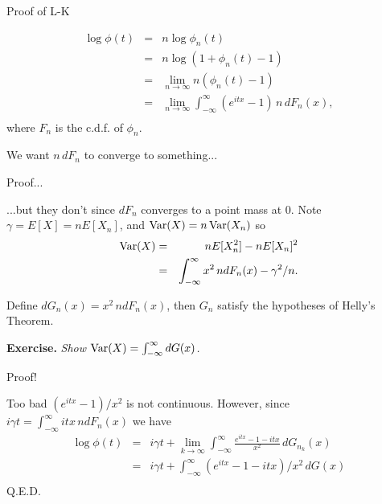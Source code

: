 \documentclass{amsart}
\newcommand{\Var}{\mathop{\rm Var}}
\begin{document}
\begin{section}{Proof of L-K}

\begin{eqnarray*}
\log\phi(t) &=& n\log\phi_n(t)\\
	&=& n\log (1 + \phi_n(t) - 1)\\
	&=& \lim_{n\to\infty} n(\phi_n(t) - 1)\\
	&=&  \lim_{n\to\infty}\int_{-\infty}^\infty (e^{itx} - 1)\,n\,dF_n(x),\\
\end{eqnarray*}
where $F_n$ is the c.d.f. of $\phi_n$.

\smallskip

We want $n\,dF_n$ to converge to something...

\end{section}

\begin{section}{Proof...}

...but they don't since $dF_n$ converges to a point mass at 0.
Note $\gamma = E[X] = nE[X_n]$, and $\Var(X) = n\Var(X_n)$ so
\begin{eqnarray*}
\Var(X) &=& nE[X_n^2] - nE[X_n]^2\\
	&=& \int_{-\infty}^\infty x^2\,ndF_n(x) - \gamma^2/n.\\
\end{eqnarray*}

Define $dG_n(x) = x^2\,ndF_n(x)$, then $G_n$ satisfy the hypotheses
of Helly's Theorem.

\smallskip

{\bf Exercise.} {\it Show $\Var(X) = \int_{-\infty}^\infty dG(x)$.}

\end{section}

\begin{section}{Proof!}

Too bad $(e^{itx} - 1)/x^2$ is not continuous.
However, since $i\gamma t = \int_{-\infty}^\infty itx\,ndF_n(x)$
we have
\begin{eqnarray*}
	\log\phi(t) &=& i\gamma t + \lim_{k\to\infty} \int_{-\infty}^\infty
		\frac{e^{itx} - 1 - itx}{x^2}\,dG_{n_k}(x)\\
	&=& i\gamma t + \int_{-\infty}^\infty
		(e^{itx} - 1 - itx)/x^2\,dG(x)\\
\end{eqnarray*}
Q.E.D.

\end{section}
\end{document}
